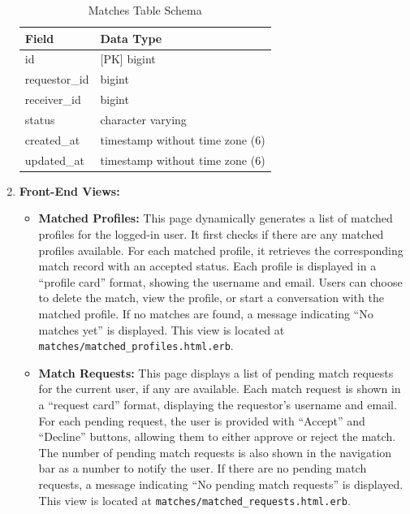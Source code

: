 \begin{enumerate}
    \begin{table}[h!]
    \captionsetup{justification=centering, singlelinecheck=false, labelsep=space}
    \centering
    \begin{tabular}{ll} %
    \hline
    \textbf{Field}               & \textbf{Data Type}                 \\ \hline
    id                           & [PK] bigint                        \\ 
    requestor\_id                & bigint                             \\ 
    receiver\_id                 & bigint                             \\ 
    status                       & character varying                  \\ 
    created\_at                  & timestamp without time zone (6)    \\ 
    updated\_at                  & timestamp without time zone (6)    \\ \hline
    \end{tabular}
    \caption{Matches Table Schema} %
    \label{tab:Matches Table Schema}
    \end{table}

    \newpage
    \item \textbf{Front-End Views:}
    \begin{itemize}
        \item \textbf{Matched Profiles:} This page dynamically generates a list of matched profiles for the logged-in user. It first checks if there are any matched profiles available. For each matched profile, it retrieves the corresponding match record with an accepted status. Each profile is displayed in a “profile card” format, showing the username and email. Users can choose to delete the match, view the profile, or start a conversation with the matched profile. If no matches are found, a message indicating “No matches yet” is displayed. This view is located at \texttt{matches/matched\_profiles.html.erb}.
    
        \item \textbf{Match Requests:} This page displays a list of pending match requests for the current user, if any are available. Each match request is shown in a “request card” format, displaying the requestor’s username and email. For each pending request, the user is provided with “Accept” and “Decline” buttons, allowing them to either approve or reject the match. The number of pending match requests is also shown in the navigation bar as a number to notify the user. If there are no pending match requests, a message indicating “No pending match requests” is displayed. This view is located at \texttt{matches/matched\_requests.html.erb}.
    \end{itemize}\bigskip
    \end{enumerate}
    \newpage 

